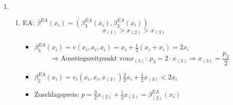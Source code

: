 \documentclass[12pt]{extreport} %
\theoremstyle{named}
\theoremstyle{nnamed}
\theoremstyle{itshape}
\theoremstyle{normal}
\begin{document}
\begin{enumerate}
\begin{proof}
\begin{enumerate}
					$$ \beta^{SA}(x_{i}) = w(x_{i}, x_{i}) = x_{i} + \frac{1}{2} \Big( x_{i} + \mathds{E}\big[ X_{(4)} \big| \underbrace{X_{(2)} = x_{i}}_{\overset{preisbestimmendes}{Signal}} \big] \Big) $$
					Grafisch:
					;
    				    				~\\
					Damit folgt:
					$$ \beta^{SA}(x_{i}) = x_{i} +\frac{1}{2} \left( x_{i} + \frac{x_{i}}{2} \right) = \frac{7}{4} x_{i} $$ ~\\
				\item $\mathds{E}\left[p^{SA}\right] = \mathds{E} \left[ \beta^{SA} \left( X_{(2,3)}\right) \right]  = \frac{7}{4}  \underbrace{\mathds{E} \left[  \left( X_{(2,3)}\right) \right]}_{\overset{\text{mit}}{\mathds{E}\left[X_{(k,n)}\right] = \frac{n-k+1}{n+1}}}  = \frac{7}{4} \cdot \frac{1}{2} = \frac{7}{8}$
				\item Als Beispiel für den Winners-Curse: $x_{1} = 0.9$, $x_{2} = 0.8$, $x_{3} = 0$
					$$ \Rightarrow v_{1} = 0.9 + \frac{1}{2} \left( 0.8 + 0 \right) = 1.3 $$
					Allerdings ist das zu zahlende Gebot, das Gebot von $i = 2$ und das lautet:
					$$ b_{2} = \beta^{SA}(x_{2}) = 0.8 + \frac{1}{2} \left( 0.8 + 0.4 \right) = 1.4, $$
					und damit ist $v_1 < p$ also der winners-curse tritt auf.
			\end{enumerate}
		\end{proof}
	\item \begin{enumerate}
			\item EA: $\beta^{EA}(x_{i}) = \left( \beta_{3}^{EA}(x_{i}), \beta_{2}^{EA}(x_{i}) \right)$ 
				$$ x_{(1)} > x_{(2)} > x_{(3)} $$
	 			\begin{itemize}
	 				\item $\beta_{3}^{EA}(x_{i}) = v(x_{i}, x_{i}, x_{i}) = x_{i} + \frac{1}{2} \left( x_{i} + x_{i} \right) = 2 x_{i}$
	 					$$ \Rightarrow \text{Ausstiegszeitpunkt von} x_{(3)}: ~ p_{3} = 2 \cdot x_{(3)} \Rightarrow x_{(3)} = \frac{p_{3}}{2}$$
	 				\item $\beta_{2}^{EA}(x_{i}) = v_{i}\left(x_{i}, x_{i}, x_{(3)} \right) \frac{3}{2} x_{i} + \frac{1}{2} x_{(3)} < 2 x_{i}$
	 				\item Zuschlagspreis: $p = \frac{3}{2} x_{(2)} + \frac{1}{2} x_{(3)} = \beta_{(2)}^{EA}(x_{i})$
	 			\end{itemize}

\end{enumerate}
\end{enumerate}
\end{document}
